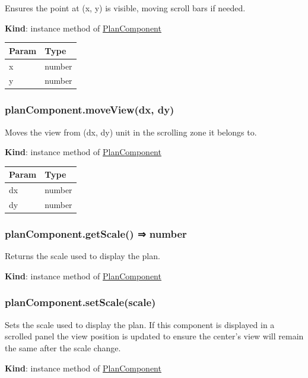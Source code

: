 \documentclass[a4paper]{report}
\begin{document}
Ensures the point at (x, y) is visible, moving scroll bars if needed.

\textbf{Kind}: instance method of
\protect\hyperlink{PlanComponent}{PlanComponent}

\begin{longtable}[]{@{}ll@{}}
\toprule
Param & Type\tabularnewline
\midrule
\endhead
x & number\tabularnewline
y & number\tabularnewline
\bottomrule
\end{longtable}

\hypertarget{plancomponent.moveviewdx-dy}{%
\subsubsection{planComponent.moveView(dx,
dy)}\label{plancomponent.moveviewdx-dy}}

Moves the view from (dx, dy) unit in the scrolling zone it belongs to.

\textbf{Kind}: instance method of
\protect\hyperlink{PlanComponent}{PlanComponent}

\begin{longtable}[]{@{}ll@{}}
\toprule
Param & Type\tabularnewline
\midrule
\endhead
dx & number\tabularnewline
dy & number\tabularnewline
\bottomrule
\end{longtable}

\hypertarget{plancomponent.getscale-number}{%
\subsubsection{planComponent.getScale() ⇒
number}\label{plancomponent.getscale-number}}

Returns the scale used to display the plan.

\textbf{Kind}: instance method of
\protect\hyperlink{PlanComponent}{PlanComponent}\\

\hypertarget{plancomponent.setscalescale}{%
\subsubsection{planComponent.setScale(scale)}\label{plancomponent.setscalescale}}

Sets the scale used to display the plan. If this component is displayed
in a scrolled panel the view position is updated to ensure the center's
view will remain the same after the scale change.

\textbf{Kind}: instance method of
\protect\hyperlink{PlanComponent}{PlanComponent}
\end{document}
